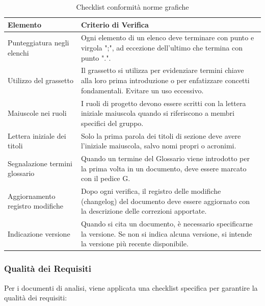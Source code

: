 \documentclass[a4paper,11pt,oneside]{scrartcl}
\begin{document}
\begin{table}[H]
\centering
\renewcommand{\arraystretch}{1.4}
\begin{tabularx}{\textwidth}{@{}p{}X@{}}
\toprule
\textbf{Elemento} & \textbf{Criterio di Verifica} \\
\midrule
Punteggiatura negli elenchi & Ogni elemento di un elenco deve terminare con punto e virgola ";", ad eccezione dell'ultimo che termina con punto ".". \\
\midrule
Utilizzo del grassetto & Il grassetto si utilizza per evidenziare termini chiave alla loro prima introduzione o per enfatizzare concetti fondamentali. Evitare un uso eccessivo. \\
\midrule
Maiuscole nei ruoli & I ruoli di progetto devono essere scritti con la lettera iniziale maiuscola quando si riferiscono a membri specifici del gruppo. \\
\midrule
Lettera iniziale dei titoli & Solo la prima parola dei titoli di sezione deve avere l'iniziale maiuscola, salvo nomi propri o acronimi. \\
\midrule
Segnalazione termini glossario & Quando un termine del Glossario viene introdotto per la prima volta in un documento, deve essere marcato con il pedice G. \\
\midrule
Aggiornamento registro modifiche & Dopo ogni verifica, il registro delle modifiche (changelog) del documento deve essere aggiornato con la descrizione delle correzioni apportate. \\
\midrule
Indicazione versione & Quando si cita un documento, è necessario specificarne la versione. Se non si indica alcuna versione, si intende la versione più recente disponibile. \\
\bottomrule
\end{tabularx}
\caption{Checklist conformità norme grafiche}
\end{table}

\subsubsection{Qualità dei Requisiti}

Per i documenti di analisi, viene applicata una checklist specifica per garantire la qualità dei requisiti:
\end{document}

